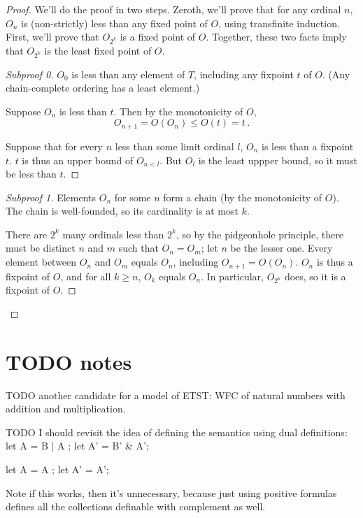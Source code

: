 \documentclass[oneside,12pt]{book}
\theoremstyle{definition}
\theoremstyle{remark}
\newenvironment{subproof}[1][\proofname]{%
  \renewcommand{\qedsymbol}{$\blacksquare$}%
  \begin{proof}[#1]%
}{%
  \end{proof}%
}
\begin{document}
\begin{proof}
  We'll do the proof in two steps. Zeroth, we'll prove that for any ordinal $n$,
  $O_n$ is (non-strictly) less than any fixed point of $O$, using transfinite
  induction. First, we'll prove that $O_{2^k}$ is a fixed point of $O$. Together,
  these two facts imply that $O_{2^k}$ is the least fixed point of $O$.
  
  \begin{subproof}[Subproof 0]
    $O_0$ is less than any element of $T$, including any fixpoint $t$ of $O$. (Any
    chain-complete ordering has a least element.)
    
    Suppose $O_n$ is less than $t$. Then by the monotonicity of $O$,
    \[O_{n+1} = O(O_n) \leq O(t) = t\,.\]
    
    Suppose that for every $n$ less than some limit ordinal $l$, $O_n$ is less than
    a fixpoint $t$. $t$ is thus an upper bound of $O_{n<l}$. But $O_l$ is the least
    uppper bound, so it must be less than $t$.
  \end{subproof}
  
  \begin{subproof}[Subproof 1]
    Elements $O_n$ for some $n$ form a chain (by the monotonicity of $O$).
    The chain is well-founded, so its cardinality is at most $k$.
    
    There are $2^k$ many ordinals less than $2^k$, so by the pidgeonhole
    principle, there must be distinct $n$ and $m$ such that $O_n = O_m$; let $n$
    be the lesser one. Every element between $O_n$ and $O_m$ equals $O_n$,
    including $O_{n+1} = O(O_n)$. $O_n$ is thus a fixpoint of $O$, and for all
    $k \geq n$, $O_k$ equals $O_n$. In particular, $O_{2^k}$ does, so
    it is a fixpoint of $O$.
  \end{subproof}
\end{proof}


\chapter{TODO notes}

TODO another candidate for a model of ETST: WFC of natural numbers with addition
and multiplication.

TODO I should revisit the idea of defining the semantics using
dual definitions:
let A  = B  | A ;
let A' = B' \& A';

let A  = A ;
let A' = A';

Note if this works, then it's unnecessary, because just using
positive formulas defines all the collections definable with complement
as well.
\end{document}
